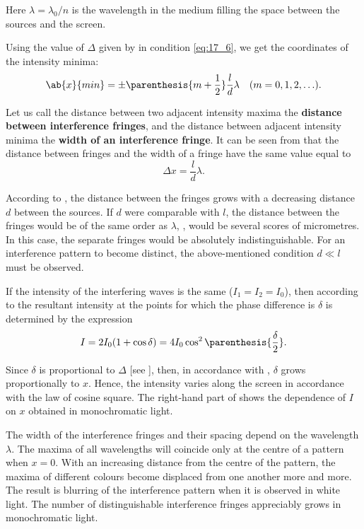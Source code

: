 \noindent
Here $\lambda=\lambda_0/n$ is the wavelength in the medium filling the space between the sources and the screen.

Using the value of $\Delta$ given by  in condition \eqref{eq:17_6}, we get the coordinates of the intensity minima:
\begin{equation}\label{eq:17_9}
    \ab{x}{min} = \pm \parenthesis{m + \frac{1}{2}} \frac{l}{d} \lambda \quad (m = 0, 1, 2, \ldots).
\end{equation}

Let us call the distance between two adjacent intensity maxima the \textbf{distance between interference fringes}, and the distance between
adjacent intensity minima the \textbf{width of an interference fringe}.
It can be seen from  that the distance between fringes and the width of a fringe have the same value equal to
\begin{equation}\label{eq:17_10}
    \Delta{x} = \frac{l}{d} \lambda.
\end{equation}

According to , the distance between the fringes grows with a decreasing distance $d$ between the sources.
If $d$ were comparable with $l$, the distance between the fringes would be of the same order as $\lambda$, \ie, would be several scores of micrometres.
In this case, the separate fringes would be absolutely indistinguishable.
For an interference pattern to become distinct, the above-mentioned condition $d\ll l$ must be observed.

If the intensity of the interfering waves is the same ($I_1=I_2=I_0$), then according to  the resultant intensity at the points
for which the phase difference is $\delta$ is determined by the expression
\begin{equation*}
    I = 2 I_0 (1 + \cos\delta) = 4 I_0 \cos^2\parenthesis{\frac{\delta}{2}}.
\end{equation*}

\noindent
Since $\delta$ is proportional to $\Delta$ [see ], then, in accordance with , $\delta$ grows proportionally to $x$.
Hence, the intensity varies along the screen in accordance with the law of cosine square.
The right-hand part of  shows the dependence of $I$ on $x$ obtained in monochromatic light.

The width of the interference fringes and their spacing depend on the wavelength $\lambda$.
The maxima of all wavelengths will coincide only at the centre of a pattern when $x=0$.
With an increasing distance from the centre of the pattern, the maxima of different colours become displaced from one another more and more.
The result is blurring of the interference pattern when it is observed in white light.
The number of distinguishable interference fringes appreciably grows in monochromatic light.

